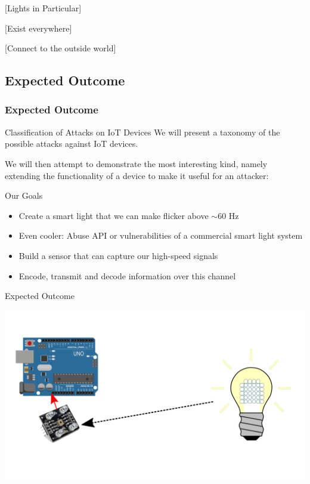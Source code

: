 \documentclass[11pt,t,usepdftitle=false,aspectratio=169]{beamer}
\begin{document}
\begin{frame}{[Lights in Particular]}
	\begin{block}{[Exist everywhere]}

	\end{block}
	\begin{block}{[Connect to the outside world]}

	\end{block}
\end{frame}

\subsection{Expected Outcome}


\begin{frame}
\frametitle{Expected Outcome}
	\begin{block}{Classification of Attacks on IoT Devices}
		We will present a taxonomy of the possible attacks against IoT devices.

		We will then attempt to demonstrate the most interesting kind, namely extending the functionality of a device to make it useful for an attacker:
	\end{block}
	\begin{block}{Our Goals}
		\begin{itemize}
			\item Create a smart light that we can make flicker above $\sim60$ Hz
			\item Even cooler: Abuse API or vulnerabilities of a commercial smart light system
			\item Build a sensor that can capture our high-speed signals
			\item Encode, transmit and decode information over this channel
		\end{itemize}
	\end{block}

\end{frame}

\begin{frame}{Expected Outcome}
	\begin{center}
		\includegraphics{img/Aufbau.png}
	\end{center}
\end{frame}
\end{document}
